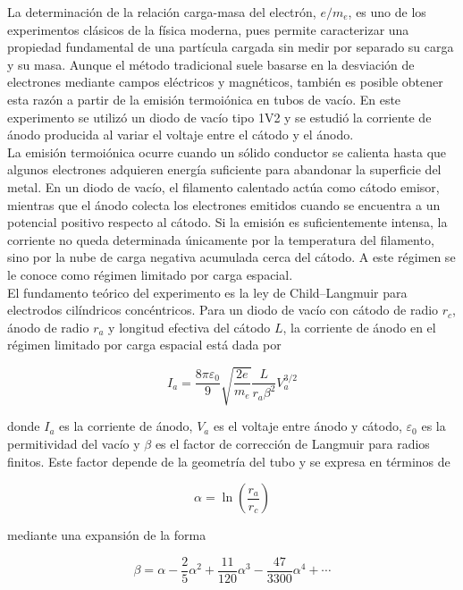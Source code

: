 La determinación de la relación carga-masa del electrón, $e/m_e$, es uno de los experimentos clásicos de la física moderna, pues permite caracterizar una propiedad fundamental de una partícula cargada sin medir por separado su carga y su masa. Aunque el método tradicional suele basarse en la desviación de electrones mediante campos eléctricos y magnéticos, también es posible obtener esta razón a partir de la emisión termoiónica en tubos de vacío. En este experimento se utilizó un diodo de vacío tipo 1V2 y se estudió la corriente de ánodo producida al variar el voltaje entre el cátodo y el ánodo.\\

La emisión termoiónica ocurre cuando un sólido conductor se calienta hasta que algunos electrones adquieren energía suficiente para abandonar la superficie del metal. En un diodo de vacío, el filamento calentado actúa como cátodo emisor, mientras que el ánodo colecta los electrones emitidos cuando se encuentra a un potencial positivo respecto al cátodo. Si la emisión es suficientemente intensa, la corriente no queda determinada únicamente por la temperatura del filamento, sino por la nube de carga negativa acumulada cerca del cátodo. A este régimen se le conoce como régimen limitado por carga espacial.\\

El fundamento teórico del experimento es la ley de Child--Langmuir para electrodos cilíndricos concéntricos. Para un diodo de vacío con cátodo de radio $r_c$, ánodo de radio $r_a$ y longitud efectiva del cátodo $L$, la corriente de ánodo en el régimen limitado por carga espacial está dada por \cite{angiolillo2009thermionic}

\begin{equation}
I_a =
\frac{8\pi\varepsilon_0}{9}
\sqrt{\frac{2e}{m_e}}
\frac{L}{r_a\beta^2}
V_a^{3/2}
\label{eq:child_langmuir}
\end{equation}

donde $I_a$ es la corriente de ánodo, $V_a$ es el voltaje entre ánodo y cátodo, $\varepsilon_0$ es la permitividad del vacío y $\beta$ es el factor de corrección de Langmuir para radios finitos. Este factor depende de la geometría del tubo y se expresa en términos de

\begin{equation}
\alpha = \ln\left(\frac{r_a}{r_c}\right)
\end{equation}

mediante una expansión de la forma

\begin{equation}
\beta =
\alpha
-\frac{2}{5}\alpha^2
+\frac{11}{120}\alpha^3
-\frac{47}{3300}\alpha^4
+\cdots
\end{equation}

